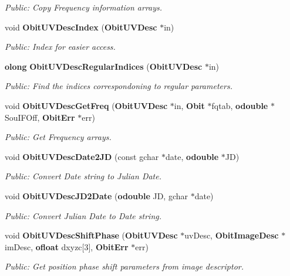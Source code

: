 \begin{CompactItemize}
\begin{CompactList}\small\item\em Public: Copy Frequency information arrays. \item\end{CompactList}\item 
void {\bf Obit\-UVDesc\-Index} ({\bf Obit\-UVDesc} $\ast$in)
\begin{CompactList}\small\item\em Public: Index for easier access. \item\end{CompactList}\item 
{\bf olong} {\bf Obit\-UVDesc\-Regular\-Indices} ({\bf Obit\-UVDesc} $\ast$in)
\begin{CompactList}\small\item\em Public: Find the indices correspondoning to regular parameters. \item\end{CompactList}\item 
void {\bf Obit\-UVDesc\-Get\-Freq} ({\bf Obit\-UVDesc} $\ast$in, {\bf Obit} $\ast$fqtab, {\bf odouble} $\ast$Sou\-IFOff, {\bf Obit\-Err} $\ast$err)
\begin{CompactList}\small\item\em Public: Get Frequency arrays. \item\end{CompactList}\item 
void {\bf Obit\-UVDesc\-Date2JD} (const gchar $\ast$date, {\bf odouble} $\ast$JD)
\begin{CompactList}\small\item\em Public: Convert Date string to Julian Date. \item\end{CompactList}\item 
void {\bf Obit\-UVDesc\-JD2Date} ({\bf odouble} JD, gchar $\ast$date)
\begin{CompactList}\small\item\em Public: Convert Julian Date to Date string. \item\end{CompactList}\item 
void {\bf Obit\-UVDesc\-Shift\-Phase} ({\bf Obit\-UVDesc} $\ast$uv\-Desc, {\bf Obit\-Image\-Desc} $\ast$im\-Desc, {\bf ofloat} dxyzc[3], {\bf Obit\-Err} $\ast$err)
\begin{CompactList}\small\item\em Public: Get position phase shift parameters from image descriptor. \item\end{CompactList}\item 

\end{CompactItemize}
